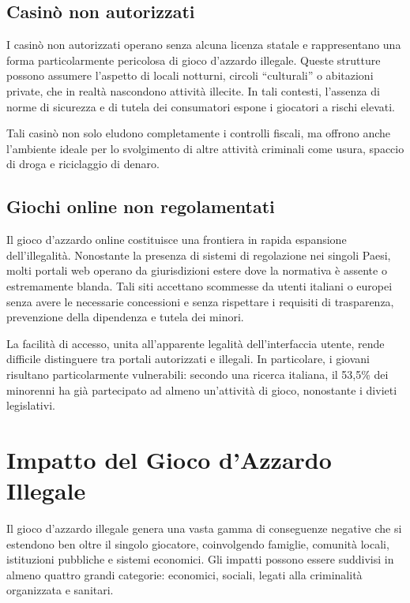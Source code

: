 \documentclass[a4paper,12pt]{article}
\begin{document}
\subsection{Casinò non autorizzati}

I casinò non autorizzati operano senza alcuna licenza statale e rappresentano una forma particolarmente pericolosa di gioco d’azzardo illegale. Queste strutture possono assumere l’aspetto di locali notturni, circoli “culturali” o abitazioni private, che in realtà nascondono attività illecite. In tali contesti, l’assenza di norme di sicurezza e di tutela dei consumatori espone i giocatori a rischi elevati.

Tali casinò non solo eludono completamente i controlli fiscali, ma offrono anche l’ambiente ideale per lo svolgimento di altre attività criminali come usura, spaccio di droga e riciclaggio di denaro.
\cite{tarina2019moneylaundering}

\subsection{Giochi online non regolamentati}

Il gioco d’azzardo online costituisce una frontiera in rapida espansione dell’illegalità. Nonostante la presenza di sistemi di regolazione nei singoli Paesi, molti portali web operano da giurisdizioni estere dove la normativa è assente o estremamente blanda. Tali siti accettano scommesse da utenti italiani o europei senza avere le necessarie concessioni e senza rispettare i requisiti di trasparenza, prevenzione della dipendenza e tutela dei minori.

La facilità di accesso, unita all’apparente legalità dell’interfaccia utente, rende difficile distinguere tra portali autorizzati e illegali. In particolare, i giovani risultano particolarmente vulnerabili: secondo una ricerca italiana, il 53,5\% dei minorenni ha già partecipato ad almeno un’attività di gioco, nonostante i divieti legislativi.
 \cite{gori2014adolescentgambling}\cite{ferrara2019childrenrisk}

\section{Impatto del Gioco d'Azzardo Illegale}

Il gioco d’azzardo illegale genera una vasta gamma di conseguenze negative che si estendono ben oltre il singolo giocatore, coinvolgendo famiglie, comunità locali, istituzioni pubbliche e sistemi economici. Gli impatti possono essere suddivisi in almeno quattro grandi categorie: economici, sociali, legati alla criminalità organizzata e sanitari. 
\end{document}
